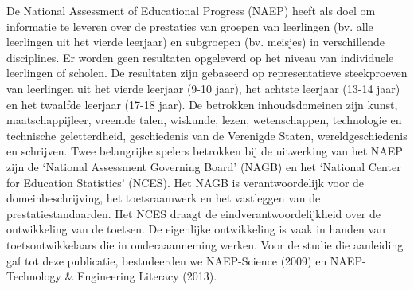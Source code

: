 \documentclass[
  letterpaper,
]{report}
\begin{document}
De National Assessment of Educational Progress (NAEP) heeft als doel om
informatie te leveren over de prestaties van groepen van leerlingen (bv.
alle leerlingen uit het vierde leerjaar) en subgroepen (bv. meisjes) in
verschillende disciplines. Er worden geen resultaten opgeleverd op het
niveau van individuele leerlingen of scholen. De resultaten zijn
gebaseerd op representatieve steekproeven van leerlingen uit het vierde
leerjaar (9-10 jaar), het achtste leerjaar (13-14 jaar) en het twaalfde
leerjaar (17-18 jaar). De betrokken inhoudsdomeinen zijn kunst,
maatschappijleer, vreemde talen, wiskunde, lezen, wetenschappen,
technologie en technische geletterdheid, geschiedenis van de Verenigde
Staten, wereldgeschiedenis en schrijven. Twee belangrijke spelers
betrokken bij de uitwerking van het NAEP zijn de `National Assessment
Governing Board' (NAGB) en het `National Center for Education
Statistics' (NCES). Het NAGB is verantwoordelijk voor de
domeinbeschrijving, het toetsraamwerk en het vastleggen van de
prestatiestandaarden. Het NCES draagt de eindverantwoordelijkheid over
de ontwikkeling van de toetsen. De eigenlijke ontwikkeling is vaak in
handen van toetsontwikkelaars die in onderaaanneming werken. Voor de
studie die aanleiding gaf tot deze publicatie, bestudeerden we
NAEP-Science (2009) en NAEP-Technology \& Engineering Literacy (2013).
\end{document}
